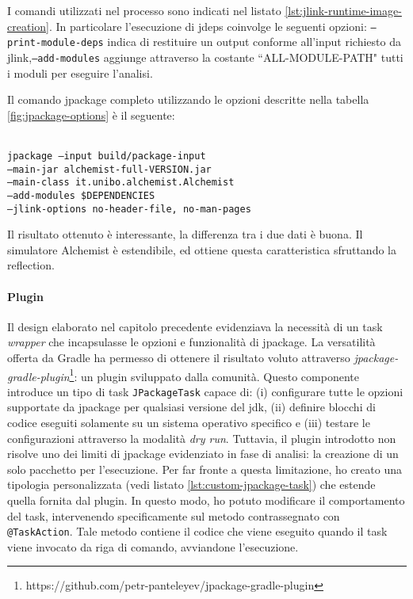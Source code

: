 I comandi utilizzati nel processo sono indicati nel listato \ref{lst:jlink-runtime-image-creation}. In particolare l'esecuzione di jdeps coinvolge le seguenti opzioni: \texttt{--print-module-deps} indica di restituire un output conforme all'input ri\-chie\-sto da jlink,\texttt{--add-modules} aggiunge attraverso la costante ``ALL-MODULE-PATH" tutti i moduli per eseguire l'analisi.



Il comando jpackage completo utilizzando le opzioni descritte nella tabella \ref{fig:jpackage-options} è il seguente:

\texttt{\\ jpackage --input build/package-input \\ \tab\tab --main-jar alchemist-full-VERSION.jar \\ \tab\tab --main-class it.unibo.alchemist.Alchemist \\ \tab\tab --add-modules \$DEPENDENCIES \\ \tab\tab --jlink-options no-header-file, no-man-pages \\}


Il risultato ottenuto è interessante, la differenza tra i due dati è buona.
Il simulatore Alchemist è estendibile, ed ottiene questa caratteristica sfruttando la reflection.


\paragraph{Plugin} Il design elaborato nel capitolo precedente evidenziava la necessità di un task \textit{wrapper} che incapsulasse le opzioni e funzionalità di jpackage. La versatilità offerta da Gradle ha permesso di ottenere il risultato voluto attraverso \textit{jpackage-gradle-plugin}\footnote{https://github.com/petr-panteleyev/jpackage-gradle-plugin}: un plugin sviluppato dalla comunità. Questo componente introduce un tipo di task \texttt{JPackageTask} capace di: (i) configurare tutte le opzioni supportate da jpackage per qualsiasi versione del \ac{jdk}, (ii) definire blocchi di codice eseguiti solamente su un sistema operativo specifico e (iii) testare le configurazioni attraverso la modalità \textit{dry run}. Tuttavia, il plugin introdotto non risolve uno dei limiti di jpackage evidenziato in fase di analisi: la creazione di un solo pacchetto per l'esecuzione. Per far fronte a questa limitazione, ho creato una tipologia personalizzata (vedi listato \ref{lst:custom-jpackage-task}) che estende quella fornita dal plugin. In questo modo, ho potuto modificare il comportamento del task, intervenendo specificamente sul metodo contrassegnato con \texttt{@TaskAction}. Tale metodo contiene il codice che viene eseguito quando il task viene invocato da riga di comando, avviandone l'esecuzione.

